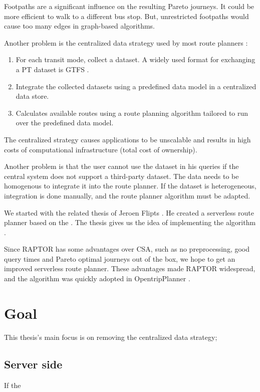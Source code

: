 Footpaths are a significant influence on the resulting Pareto journeys. It could be more efficient to walk to a different bus stop. But, unrestricted footpaths would cause too many edges in graph-based algorithms.

Another problem is the centralized data strategy used by most route planners \cite{rojas_melendez_julian_andres_decentralized_2020}:
\begin{enumerate}
    \item For each transit mode, collect a dataset. A widely used format for exchanging a PT dataset is GTFS \cite{noauthor_gtfs_2022}.
    \item Integrate the collected datasets using a predefined data model in a centralized data store.
    \item Calculates available routes using a route planning algorithm tailored to run over the predefined data model.
\end{enumerate}

The centralized strategy causes applications to be unscalable and results in high costs of computational infrastructure (total cost of ownership). 

Another problem is that the user cannot use the dataset in his queries if the central system does not support a third-party dataset. The data needs to be homogenous to integrate it into the route planner. If the dataset is heterogeneous, integration is done manually, and the route planner algorithm must be adapted.



We started with the related thesis of Jeroen Flipts \cite{flipts_fragmenting_2020}. He created a serverless route planner based on the  \cite{dibbelt_intriguingly_2013}. The thesis gives us the idea of implementing the  algorithm \cite{delling_round-based_2015}.

Since RAPTOR has some advantages over CSA, such as no preprocessing, good query times and Pareto optimal journeys out of the box, we hope to get an improved serverless route planner. These advantages made RAPTOR widespread, and the algorithm was quickly adopted in OpentripPlanner \cite{noauthor_otp_2023}.

\section{Goal}

This thesis's main focus is on removing the centralized data strategy;
\subsection{Server side}
If the 


